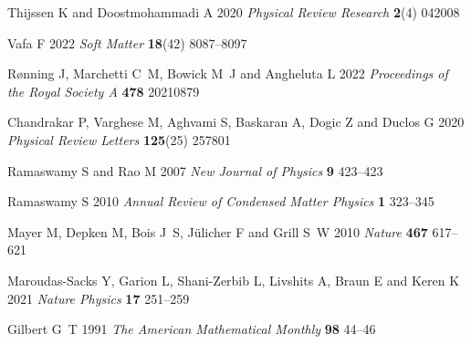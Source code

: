 \documentclass[12pt]{iopart}
\begin{document}
\begin{thebibliography}{100}
				Thijssen K and Doostmohammadi A 2020 {\em Physical Review Research\/} {\bf 2}(4)
				  042008
				
				Vafa F 2022 {\em Soft Matter\/} {\bf 18}(42) 8087--8097
				
				R{\o}nning J, Marchetti C~M, Bowick M~J and Angheluta L 2022 {\em Proceedings
				  of the Royal Society A\/} {\bf 478} 20210879
				
				Chandrakar P, Varghese M, Aghvami S, Baskaran A, Dogic Z and Duclos G 2020 {\em
				  Physical Review Letters\/} {\bf 125}(25) 257801
				
				Ramaswamy S and Rao M 2007 {\em New Journal of Physics\/} {\bf 9} 423--423
				
				Ramaswamy S 2010 {\em Annual Review of Condensed Matter Physics\/} {\bf 1}
				  323--345
				
				Mayer M, Depken M, Bois J~S, J{\"u}licher F and Grill S~W 2010 {\em Nature\/}
				  {\bf 467} 617--621
				
				Maroudas-Sacks Y, Garion L, Shani-Zerbib L, Livshits A, Braun E and Keren K
				  2021 {\em Nature Physics\/} {\bf 17} 251--259
				
				Gilbert G~T 1991 {\em The American Mathematical Monthly\/} {\bf 98} 44--46
				
				\end{thebibliography}
				
		
\end{document}
